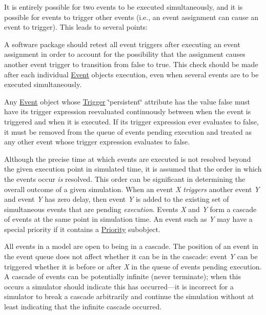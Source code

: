 It is entirely possible for two events to be executed simultaneously, and it is possible for events to trigger other events (i.\+e., an event assignment can cause an event to trigger). This leads to several points\+: 
\begin{DoxyItemize}
\item A software package should retest all event triggers after executing an event assignment in order to account for the possibility that the assignment causes another event trigger to transition from {\ttfamily false} to {\ttfamily true}. This check should be made after each individual \hyperlink{class_event}{Event} object\textquotesingle{}s execution, even when several events are to be executed simultaneously.


\item Any \hyperlink{class_event}{Event} object whose \hyperlink{class_trigger}{Trigger} \char`\"{}persistent\char`\"{} attribute has the value {\ttfamily false} must have its trigger expression reevaluated continuously between when the event is triggered and when it is executed. If its trigger expression ever evaluates to {\ttfamily false}, it must be removed from the queue of events pending execution and treated as any other event whose trigger expression evaluates to {\ttfamily false}.


\item Although the precise time at which events are executed is not resolved beyond the given execution point in simulated time, it is assumed that the order in which the events occur {\itshape is} resolved. This order can be significant in determining the overall outcome of a given simulation. When an event {\itshape X} {\itshape triggers} another event {\itshape Y} and event {\itshape Y} has zero delay, then event {\itshape Y} is added to the existing set of simultaneous events that are pending {\itshape execution}. Events {\itshape X} and {\itshape Y} form a cascade of events at the same point in simulation time. An event such as {\itshape Y} may have a special priority if it contains a \hyperlink{class_priority}{Priority} subobject.


\item All events in a model are open to being in a cascade. The position of an event in the event queue does not affect whether it can be in the cascade\+: event {\itshape Y} can be triggered whether it is before or after {\itshape X} in the queue of events pending execution. A cascade of events can be potentially infinite (never terminate); when this occurs a simulator should indicate this has occurred---it is incorrect for a simulator to break a cascade arbitrarily and continue the simulation without at least indicating that the infinite cascade occurred.



\end{DoxyItemize}
